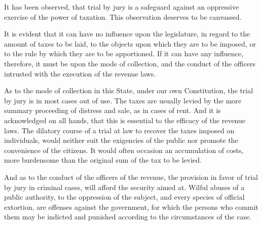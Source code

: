 It has been observed, that trial by jury is a safeguard against an oppressive exercise of the power of taxation. 
This observation deserves to be canvassed.

It is evident that it can have no influence upon the legislature, in regard to the amount of taxes to be laid, to the objects upon which they are to be imposed, or to the rule by which they are to be apportioned. 
If it can have any influence, therefore, it must be upon the mode of collection, and the conduct of the officers intrusted with the execution of the revenue laws.

As to the mode of collection in this State, under our own Constitution, the trial by jury is in most cases out of use. 
The taxes are usually levied by the more summary proceeding of distress and sale, as in cases of rent. 
And it is acknowledged on all hands, that this is essential to the efficacy of the revenue laws. 
The dilatory course of a trial at law to recover the taxes imposed on individuals, would neither suit the exigencies of the public nor promote the convenience of the citizens. 
It would often occasion an accumulation of costs, more burdensome than the original sum of the tax to be levied.

And as to the conduct of the officers of the revenue, the provision in favor of trial by jury in criminal cases, will afford the security aimed at. 
Wilful abuses of a public authority, to the oppression of the subject, and every species of official extortion, are offenses against the government, for which the persons who commit them may be indicted and punished according to the circumstances of the case.

